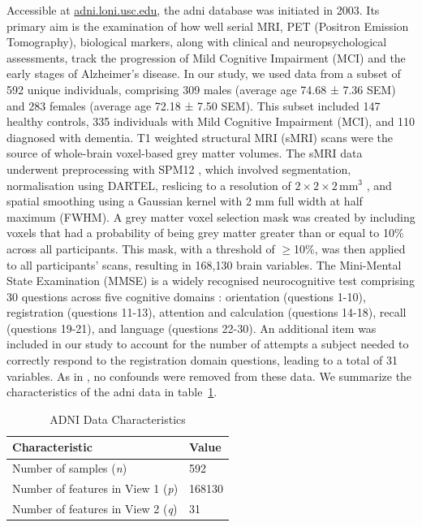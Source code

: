 Accessible at \url{adni.loni.usc.edu}, the \acrshort{adni} database was initiated in 2003. 
Its primary aim is the examination of how well serial MRI, PET (Positron Emission Tomography), biological markers, along with clinical and neuropsychological assessments, track the progression of Mild Cognitive Impairment (MCI) and the early stages of Alzheimer’s disease. 
In our study, we used data from a subset of 592 unique individuals, comprising 309 males (average age 74.68 ± 7.36 SEM) and 283 females (average age 72.18 ± 7.50 SEM). This subset included 147 healthy controls, 335 individuals with Mild Cognitive Impairment (MCI), and 110 diagnosed with dementia. 
T1 weighted structural MRI (sMRI) scans were the source of whole-brain voxel-based grey matter volumes. The sMRI data underwent preprocessing with SPM12 \citep{ashburner2014spm12}, which involved segmentation, normalisation using DARTEL, reslicing to a resolution of \(2 \times 2 \times 2 \, \text{mm}^3\)
, and spatial smoothing using a Gaussian kernel with 2 mm full width at half maximum (FWHM). A grey matter voxel selection mask was created by including voxels that had a probability of being grey matter greater than or equal to 10\% across all participants. This mask, with a threshold of $\geq$10\%, was then applied to all participants' scans, resulting in 168,130 brain variables.
The Mini-Mental State Examination (MMSE) is a widely recognised neurocognitive test comprising 30 questions across five cognitive domains \citep{folstein1975mini}: orientation (questions 1-10), registration (questions 11-13), attention and calculation (questions 14-18), recall (questions 19-21), and language (questions 22-30).
An additional item was included in our study to account for the number of attempts a subject needed to correctly respond to the registration domain questions, leading to a total of 31 variables. As in \citet{monteiro2016multiple}, no confounds were removed from these data.
We summarize the characteristics of the \acrshort{adni} data in table~\ref{tab:adni-parameters}.

\begin{table}
    \centering
    \caption{ADNI Data Characteristics}
    \begin{tabular}{| l | l |}
        \hline
        \textbf{Characteristic}                        & \textbf{Value} \\
        \hline
        Number of samples (\textit{n})            & 592            \\
        Number of features in View 1 (\textit{p}) & 168130         \\
        Number of features in View 2 (\textit{q}) & 31             \\
        \hline
    \end{tabular}\label{tab:adni-parameters}
\end{table}


